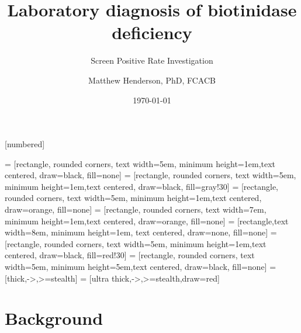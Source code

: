 \documentclass[presentation, smaller]{beamer}
\author{Matthew Henderson, PhD, FCACB}
\date{\today}
\title{Laboratory diagnosis of biotinidase deficiency}
\subtitle{Screen Positive Rate Investigation}
\institute[NSO]{Newborn Screening Ontario}
\begin{document}
\maketitle


\vspace{220pt}
\beamertemplatenavigationsymbolsempty
{}[numbered]


 = [rectangle, rounded corners, text width=5em, minimum height=1em,text centered, draw=black, fill=none]
 = [rectangle, rounded corners, text width=5em, minimum height=1em,text centered, draw=black, fill=gray!30]
 = [rectangle, rounded corners, text width=5em, minimum height=1em,text centered, draw=orange, fill=none]
 = [rectangle, rounded corners, text width=7em, minimum height=1em,text centered, draw=orange, fill=none]
 = [rectangle,text width=8em, minimum height=1em, text centered, draw=none, fill=none]
 = [rectangle, rounded corners, text width=5em, minimum height=1em,text centered, draw=black, fill=red!30]
 = [rectangle, rounded corners, text width=5em, minimum height=5em,text centered, draw=black, fill=none]
 = [thick,->,>=stealth]
 = [ultra thick,->,>=stealth,draw=red]

\section{Background}
\label{sec:orgheadline6}
\end{document}
